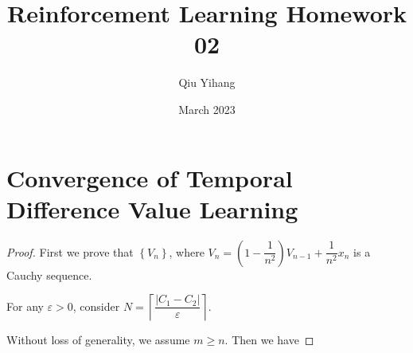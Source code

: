 \documentclass{article}
\title{\textbf{Reinforcement Learning Homework 02}}
\author{Qiu Yihang}
\date{March 2023}
\newcommand{\set}[1]{\left\{#1\right\}}
\begin{document}
\maketitle

\vspace{3em}
\section{Convergence of Temporal Difference Value Learning}
\vspace{1em}
\begin{proof}
    First we prove that $\set{V_n}$, where $V_n=\left(1-\dfrac{1}{n^2}\right)V_{n-1}+\dfrac{1}{n^2}x_n$ is a Cauchy sequence. 

    \vspace{0.5em} \hspace{1.3em}
    For any $\varepsilon>0$, consider $N=\left\lceil\dfrac{\left|C_1-C_2\right|}{\varepsilon}\right\rceil$.

    \vspace{0.5em} \hspace{1.3em}
    Without loss of generality, we assume $m\geq n$. Then we have


\end{proof}
\end{document}
